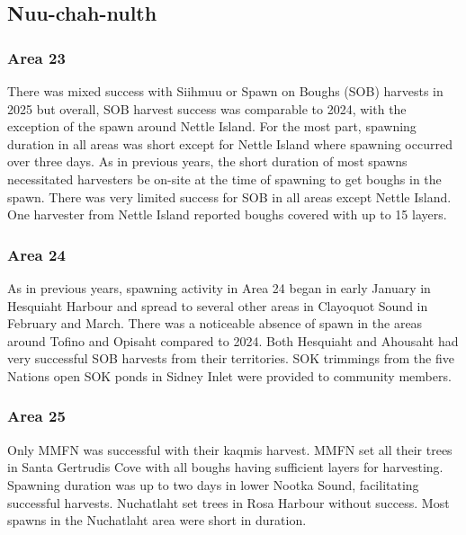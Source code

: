 \subsection{Nuu-chah-nulth}

\subsubsection{Area 23}

There was mixed success with Siihmuu or Spawn on Boughs (SOB)
harvests in 2025 but overall,
SOB harvest success was comparable to 2024,
with the exception of the spawn around Nettle Island.
For the most part,
spawning duration in all areas was short except for Nettle Island
where spawning occurred over three days.
As in previous years,
the short duration of most spawns necessitated harvesters
be on-site at the time of spawning to get boughs in the spawn.
There was very limited success for SOB in all areas except Nettle Island.
One harvester from Nettle Island reported boughs covered with up to 15 layers.

\subsubsection{Area 24}

As in previous years,
spawning activity in Area 24 began in early January in Hesquiaht Harbour
and spread to several other areas in Clayoquot Sound
in February and March.
There was a noticeable absence of spawn
in the areas around Tofino and Opisaht compared to 2024.
Both Hesquiaht and Ahousaht had very successful SOB harvests
from their territories.
SOK trimmings from the five Nations open SOK ponds in Sidney Inlet
were provided to community members.

\subsubsection{Area 25}

Only MMFN was successful with their kaqmis harvest.
MMFN set all their trees in Santa Gertrudis Cove
with all boughs having sufficient layers for harvesting.
Spawning duration was up to two days in lower Nootka Sound,
facilitating successful harvests.
Nuchatlaht set trees in Rosa Harbour without success.
Most spawns in the Nuchatlaht area were short in duration.
